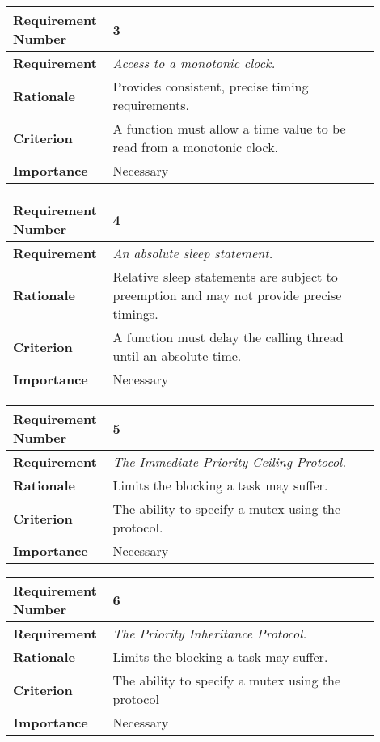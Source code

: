 \begin{table}[!h]
\centering
\begin{tabular}{|L{0.2\linewidth}|L{0.7\linewidth}|}
\hline
\textbf{Requirement Number} & 3 \\ \hline
\textbf{Requirement} & \emph{Access to a monotonic clock.} \\ \hline
\textbf{Rationale}      & Provides consistent, precise timing requirements. \\ \hline
\textbf{Criterion}      & A function must allow a time value to be read from a monotonic
                clock. \\ \hline
\textbf{Importance}     & Necessary \\ \hline
\end{tabular}
\end{table}
\begin{table}[!h]
\centering
\begin{tabular}{|L{0.2\linewidth}|L{0.7\linewidth}|}
\hline
\textbf{Requirement Number} & 4 \\ \hline
\textbf{Requirement} & \emph{An absolute sleep statement.} \\ \hline
\textbf{Rationale}      & Relative sleep statements are subject to preemption and may not 
                provide precise timings. \\ \hline
\textbf{Criterion}      & A function must delay the calling thread until an absolute time. \\ \hline
\textbf{Importance}     & Necessary \\ \hline
\end{tabular}
\end{table}
\begin{table}[!h]
\centering
\begin{tabular}{|L{0.2\linewidth}|L{0.7\linewidth}|}
\hline
\textbf{Requirement Number} & 5 \\ \hline
\textbf{Requirement} & \emph{The Immediate Priority Ceiling
Protocol.} \\ \hline
\textbf{Rationale}      & Limits the blocking a task may suffer.  \\ \hline
\textbf{Criterion}      & The ability to specify a mutex using the protocol.\\ \hline
\textbf{Importance}     & Necessary \\ \hline
\end{tabular}
\end{table}
\begin{table}[!h]
\centering
\begin{tabular}{|L{0.2\linewidth}|L{0.7\linewidth}|}
\hline
\textbf{Requirement Number} & 6 \\ \hline
\textbf{Requirement} & \emph{The Priority Inheritance Protocol.}\\ \hline
\textbf{Rationale}      & Limits the blocking a task may suffer. \\ \hline
\textbf{Criterion}      & The ability to specify a mutex using the protocol\\ \hline
\textbf{Importance}     & Necessary \\ \hline
\end{tabular}
\end{table}
